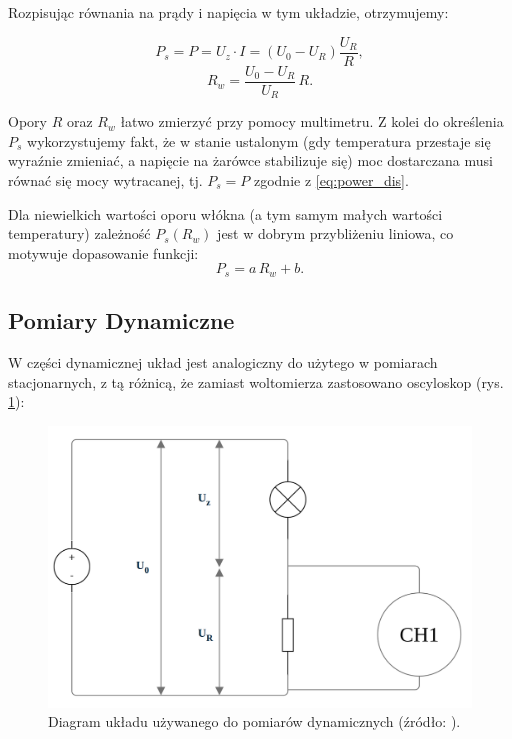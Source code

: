 \documentclass[12pt]{article}
\begin{document}
Rozpisując równania na prądy i napięcia w tym układzie, otrzymujemy:

\begin{equation}
    P_s = P = U_z \cdot I = (U_0 - U_R) \frac{U_R}{R},
    \label{eq:power_dis}
\end{equation}
\begin{equation}
    R_w = \frac{U_0 - U_R}{U_R}\,R.
    \label{eq:bulb_resistance}
\end{equation}

Opory $R$ oraz $R_w$ łatwo zmierzyć przy pomocy multimetru. Z kolei do określenia $P_s$ wykorzystujemy fakt, że w stanie ustalonym (gdy temperatura przestaje się wyraźnie zmieniać,
a napięcie na żarówce stabilizuje się) moc dostarczana musi równać się mocy wytracanej, tj. $P_s = P$ zgodnie z \eqref{eq:power_dis}.

Dla niewielkich wartości oporu włókna (a tym samym małych wartości temperatury) zależność $P_s(R_w)$ jest w dobrym przybliżeniu liniowa, co motywuje dopasowanie funkcji:
\begin{equation}
    P_s = a\,R_w + b.
    \label{eq:power_line}
\end{equation}

\newpage

\subsection{Pomiary Dynamiczne}
W części dynamicznej układ jest analogiczny do użytego w pomiarach stacjonarnych, z tą różnicą, że zamiast woltomierza zastosowano oscyloskop (rys. \ref{fig:pomiar_dyn}):
\begin{figure}[H]
    \centering
    \includegraphics[scale=0.25]{dynamic}
    \caption{Diagram układu używanego do pomiarów dynamicznych (źródło: \cite{diagram}).}
    \label{fig:pomiar_dyn}
\end{figure}
\end{document}
